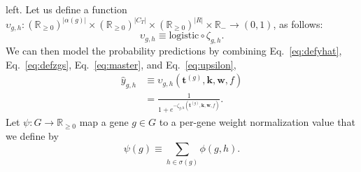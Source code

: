 \documentclass[11pt,notitlepage,english]{article}
\begin{document}
left.
Let us define a function
$\upsilon_{g,h}: {({\mathbb R}_{\geq 0})}^{|\alpha(g)|} \times {({\mathbb R}_{\geq 0})}^{|C_T|} \times {({\mathbb R}_{\geq 0})}^{|R|} \times {\mathbb R}_{-} \rightarrow (0,1)$,
as follows:
\begin{equation}\label{eq:upsilon}
\upsilon_{g,h} \equiv \textrm{logistic} \circ \zeta_{g,h}.
\end{equation}
We can then model the probability predictions
by combining
Eq.~\ref{eq:defyhat},
Eq.~\ref{eq:defzgs},
Eq.~\ref{eq:master}, and
Eq.~\ref{eq:upsilon}, 
\begin{align}
  \widehat{y}_{g,h} & \equiv \upsilon_{g,h}({\boldsymbol t}^{(g)}, {\boldsymbol k}, {\boldsymbol w},
  f) \\
  &=
\frac{1}{1 + e^{-\zeta_{g,h}({\boldsymbol t}^{(g)}, {\boldsymbol k}, {\boldsymbol w},
  f)}}.
\end{align}
Let $\psi: G\rightarrow {\mathbb R}_{\geq 0}$ map a gene $g \in G$ to
a per-gene weight normalization value that we define by
\begin{equation}
\psi(g) \equiv \sum_{h \in \sigma(g)} \phi(g,h).
\end{equation}
\end{document}
